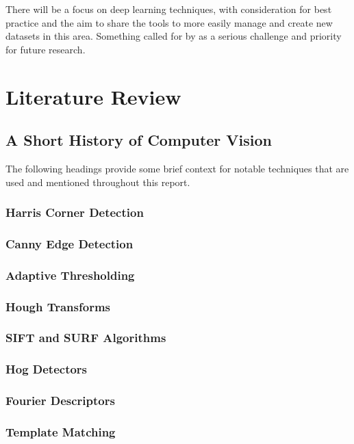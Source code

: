 There will be a focus on deep learning techniques, with consideration for best practice and the aim to share the 
tools to more easily manage and create new datasets in this area.  Something 
called for by \cite{Ding2016ChessVisionC} as a serious challenge and priority for future research.

\section{Literature Review}
\label{research}


\subsection{A Short History of Computer Vision}
The following headings provide some brief context for notable techniques that are used and mentioned throughout this report.

\subsubsection{Harris Corner Detection}
\subsubsection{Canny Edge Detection}
\subsubsection{Adaptive Thresholding}
\subsubsection{Hough Transforms}
\subsubsection{SIFT and SURF Algorithms}
\subsubsection{Hog Detectors}
\subsubsection{Fourier Descriptors}
\subsubsection{Template Matching}
